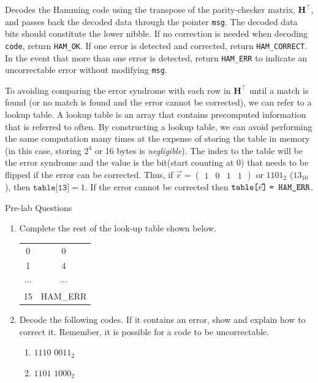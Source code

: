 \documentclass[11pt]{article}
\begin{document}
Decodes the Hamming code using the transpose of the parity-checker
matrix, $\boldsymbol{H}^\intercal$, and passes back the decoded data
through the pointer \texttt{msg}. The decoded data bits should
constitute the lower nibble. If no correction is needed when decoding
\texttt{code}, return \texttt{HAM\_OK}. If one error is detected and
corrected, return \texttt{HAM\_CORRECT}. In the event that more than one
error is detected, return \texttt{HAM\_ERR} to indicate an uncorrectable
error without modifying \texttt{msg}.

To avoiding comparing the error syndrome with each row in
$\boldsymbol{H}^\intercal$ until a match is found (or no match is found
and the error cannot be corrected), we can refer to a lookup table. A
lookup table is an array that contains precomputed information that is
referred to often. By constructing a lookup table, we can avoid
performing the same computation many times at the expense of storing the
table in memory (in this case, storing $2^4$ or 16 bytes is
\emph{negligible}). The index to the table will be the error syndrome
and the value is the bit(start counting at 0) that needs to be flipped
if the error can be corrected. Thus, if $\Vec{e} = \begin{pmatrix}1 & 0
& 1 & 1 \end{pmatrix}$ or $1101_2$ ($13_{10}$), then
$\texttt{table[13]} = 1$. If the error cannot be corrected then
$\texttt{table[$\Vec{e}$]\;= HAM\_ERR}$.

\medskip
\begin{prelab}{Pre-lab Questions}
    \begin{enumerate}
        \item Complete the rest of the look-up table shown below.\\
        \begin{tabular}{ c|c }
            0 & 0 \\
            1 & 4 \\
            $\cdots$ & $\cdots$ \\
            15 & HAM\_ERR
        \end{tabular}
        \item Decode the following codes. If it contains an error, show
          and explain how to correct it. Remember, it is possible for a
          code to be uncorrectable.
        \begin{enumerate}
            \item $1110$ $0011_2$
            \item $1101$ $1000_2$
        \end{enumerate}
    \end{enumerate}
\end{prelab}
\end{document}
